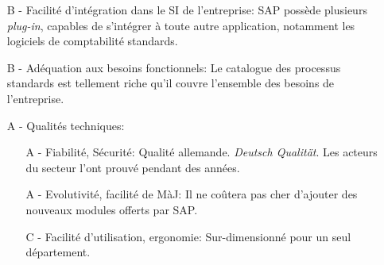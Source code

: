 \begin{itemize}
\item[B -] Facilité d'intégration dans le SI de l'entreprise:\el
	SAP possède plusieurs {\sl plug-in}, capables de s'intégrer à toute
    autre application, notamment les logiciels de comptabilité standards.
	
\item[B -] Adéquation aux besoins fonctionnels:\el
	Le catalogue des processus standards est tellement riche qu'il
    couvre l'ensemble des besoins de l'entreprise.
	
\item[A -] Qualités techniques:
    \begin{itemize}
	\item[A -] Fiabilité, Sécurité:\el
		Qualité allemande. {\sl Deutsch Qualität}. Les acteurs du
        secteur l'ont prouvé pendant des années.
	
	\item[A -] Evolutivité, facilité de MàJ:\el
		Il ne coûtera pas cher d'ajouter des nouveaux modules offerts par SAP. 

	\item[C -] Facilité d'utilisation, ergonomie:\el
		Sur-dimensionné pour un seul département.
    \end{itemize}
\end{itemize}
